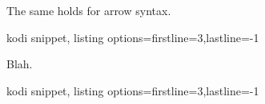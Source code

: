 The same holds for arrow syntax.

\begin{tcblisting}{kodi snippet, listing options={firstline=3,lastline=-1}}
\end{tcblisting}

Blah.

\begin{tcblisting}{kodi snippet, listing options={firstline=3,lastline=-1}}
\end{tcblisting}

